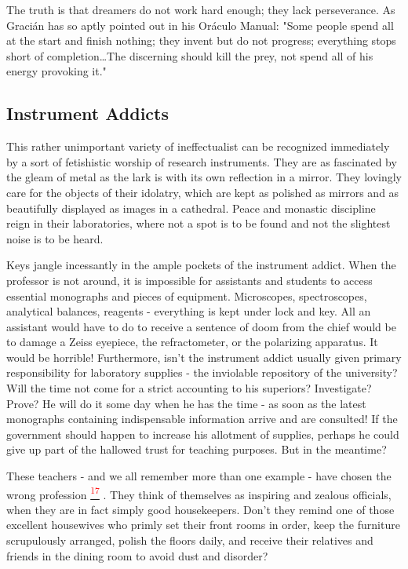 \documentclass{article}
\newcommand{\noteref}[1]{%
 \hypertarget{ref:#1}{}%
 \hyperlink{note:#1}{\textsuperscript{\textcolor{red}{#1}}}%
}
\begin{document}
The truth is that dreamers do not work hard enough; they lack perseverance. As Gracián has so aptly pointed out in his Oráculo Manual: "Some people spend all at the start and finish nothing; they invent but do not progress; everything stops short of completion…The discerning should kill the prey, not spend all of his energy provoking it."

\subsection*{Instrument Addicts}

This rather unimportant variety of ineffectualist can be recognized immediately by a sort of fetishistic worship of research instruments. They are as fascinated by the gleam of metal as the lark is with its own reflection in a mirror. They lovingly care for the objects of their idolatry, which are kept as polished as mirrors and as beautifully displayed as images in a cathedral. Peace and monastic discipline reign in their laboratories, where not a spot is to be found and not the slightest noise is to be heard.

Keys jangle incessantly in the ample pockets of the instrument addict. When the professor is not around, it is impossible for assistants and students to access essential monographs and pieces of equipment. Microscopes, spectroscopes, analytical balances, reagents - everything is kept under lock and key. All an assistant would have to do to receive a sentence of doom from the chief would be to damage a Zeiss eyepiece, the refractometer, or the polarizing apparatus. It would be horrible! Furthermore, isn’t the instrument addict usually given primary responsibility for laboratory supplies - the inviolable repository of the university? Will the time not come for a strict accounting to his superiors? Investigate? Prove? He will do it some day when he has the time - as soon as the latest monographs containing indispensable information arrive and are consulted! If the government should happen to increase his allotment of supplies, perhaps he could give up part of the hallowed trust for teaching purposes. But in the meantime?

These teachers - and we all remember more than one example - have chosen the wrong profession\noteref{17}. They think of themselves as inspiring and zealous officials, when they are in fact simply good housekeepers. Don’t they remind one of those excellent housewives who primly set their front rooms in order, keep the furniture scrupulously arranged, polish the floors daily, and receive their relatives and friends in the dining room to avoid dust and disorder?
\end{document}
